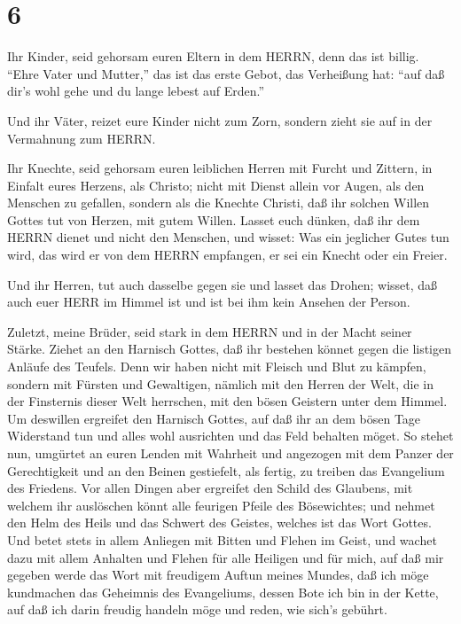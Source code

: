 \hypertarget{section-5}{%
\section{6}\label{section-5}}

 Ihr Kinder, seid gehorsam euren Eltern in dem HERRN, denn
das ist billig.  ``Ehre Vater und Mutter,'' das ist das
erste Gebot, das Verheißung hat:  ``auf daß dir's wohl gehe
und du lange lebest auf Erden.''

 Und ihr Väter, reizet eure Kinder nicht zum Zorn, sondern
zieht sie auf in der Vermahnung zum HERRN.

 Ihr Knechte, seid gehorsam euren leiblichen Herren mit
Furcht und Zittern, in Einfalt eures Herzens, als Christo; 
nicht mit Dienst allein vor Augen, als den Menschen zu gefallen, sondern
als die Knechte Christi, daß ihr solchen Willen Gottes tut von Herzen,
mit gutem Willen.  Lasset euch dünken, daß ihr dem HERRN
dienet und nicht den Menschen,  und wisset: Was ein
jeglicher Gutes tun wird, das wird er von dem HERRN empfangen, er sei
ein Knecht oder ein Freier.

 Und ihr Herren, tut auch dasselbe gegen sie und lasset das
Drohen; wisset, daß auch euer HERR im Himmel ist und ist bei ihm kein
Ansehen der Person.

 Zuletzt, meine Brüder, seid stark in dem HERRN und in der
Macht seiner Stärke.  Ziehet an den Harnisch Gottes, daß
ihr bestehen könnet gegen die listigen Anläufe des Teufels.
 Denn wir haben nicht mit Fleisch und Blut zu kämpfen,
sondern mit Fürsten und Gewaltigen, nämlich mit den Herren der Welt, die
in der Finsternis dieser Welt herrschen, mit den bösen Geistern unter
dem Himmel.  Um deswillen ergreifet den Harnisch Gottes,
auf daß ihr an dem bösen Tage Widerstand tun und alles wohl ausrichten
und das Feld behalten möget.  So stehet nun, umgürtet an
euren Lenden mit Wahrheit und angezogen mit dem Panzer der Gerechtigkeit
 und an den Beinen gestiefelt, als fertig, zu treiben das
Evangelium des Friedens.  Vor allen Dingen aber ergreifet
den Schild des Glaubens, mit welchem ihr auslöschen könnt alle feurigen
Pfeile des Bösewichtes;  und nehmet den Helm des Heils und
das Schwert des Geistes, welches ist das Wort Gottes.  Und
betet stets in allem Anliegen mit Bitten und Flehen im Geist, und wachet
dazu mit allem Anhalten und Flehen für alle Heiligen  und
für mich, auf daß mir gegeben werde das Wort mit freudigem Auftun meines
Mundes, daß ich möge kundmachen das Geheimnis des Evangeliums,
 dessen Bote ich bin in der Kette, auf daß ich darin
freudig handeln möge und reden, wie sich's gebührt.

